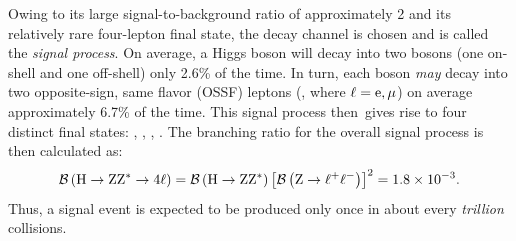 
Owing to its large signal-to-background ratio of approximately 2 and its relatively rare four-lepton final state, the \hzzfourl decay channel is chosen and is called the \emph{signal process}.
On average, a Higgs boson will decay into two \PZ bosons (one on-shell and one off-shell) only 2.6\% of the time.
In turn, each \PZ boson \emph{may} decay into two opposite-sign, same flavor (OSSF) leptons (\Ztolplm, where $\ell = \mathrm{e}, \mu$) on average approximately 6.7\% of the time.
This signal process then gives rise to four distinct final states: \foure, \fourmu, \twoetwomu, \twomutwoe.
The branching ratio for the overall signal process is then calculated as: %
\begin{equation*}
    \BRof{\hzzfourl} = \BRof{\htozz} \left[ \BRof{\Ztolplm} \right]^2 = 1.8\tentotheminus{3}.
\end{equation*}
Thus, a signal event is expected to be produced only once in about every \emph{trillion} \pp collisions.

